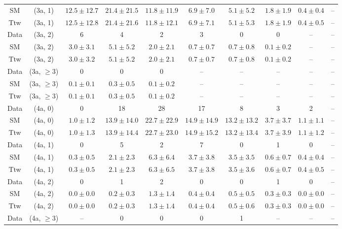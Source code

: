 \begin{table}[h!]
{\begin{tabular}{cccccccccc}
	SM & (3a, 1) & $12.5\pm 12.7$ & $21.4\pm 21.5$ & $11.8\pm 11.9$ & $6.9\pm 7.0$ & $5.1\pm 5.2$ & $1.8\pm 1.9$ & $0.4\pm 0.4$ & -- \\[0.5ex] 
	Ttw & (3a, 1) & $12.5\pm 12.8$ & $21.4\pm 21.6$ & $11.8\pm 12.1$ & $6.9\pm 7.1$ & $5.1\pm 5.3$ & $1.8\pm 1.9$ & $0.4\pm 0.5$ & -- \\[0.5ex] 
	Data & (3a, 2) & 6 & 4 & 2 & 3 & 0 & 0 & -- & -- \\[0.5ex] 
	SM & (3a, 2) & $3.0\pm 3.1$ & $5.1\pm 5.2$ & $2.0\pm 2.1$ & $0.7\pm 0.7$ & $0.7\pm 0.8$ & $0.1\pm 0.2$ & -- & -- \\[0.5ex] 
	Ttw & (3a, 2) & $3.0\pm 3.2$ & $5.1\pm 5.2$ & $2.0\pm 2.1$ & $0.7\pm 0.7$ & $0.7\pm 0.8$ & $0.1\pm 0.2$ & -- & -- \\[0.5ex] 
	Data & (3a, $\ge3$) & 0 & 0 & 0 & -- & -- & -- & -- & -- \\[0.5ex] 
	SM & (3a, $\ge3$) & $0.1\pm 0.1$ & $0.3\pm 0.5$ & $0.1\pm 0.2$ & -- & -- & -- & -- & -- \\[0.5ex] 
	Ttw & (3a, $\ge3$) & $0.1\pm 0.1$ & $0.3\pm 0.5$ & $0.1\pm 0.2$ & -- & -- & -- & -- & -- \\[0.5ex] 
	Data & (4a, 0) & 0 & 18 & 28 & 17 & 8 & 3 & 2 & -- \\[0.5ex] 
	SM & (4a, 0) & $1.0\pm 1.2$ & $13.9\pm 14.0$ & $22.7\pm 22.9$ & $14.9\pm 14.9$ & $13.2\pm 13.2$ & $3.7\pm 3.7$ & $1.1\pm 1.1$ & -- \\[0.5ex] 
	Ttw & (4a, 0) & $1.0\pm 1.3$ & $13.9\pm 14.4$ & $22.7\pm 23.0$ & $14.9\pm 15.2$ & $13.2\pm 13.4$ & $3.7\pm 3.9$ & $1.1\pm 1.2$ & -- \\[0.5ex] 
	Data & (4a, 1) & 0 & 5 & 2 & 7 & 0 & 1 & 0 & -- \\[0.5ex] 
	SM & (4a, 1) & $0.3\pm 0.5$ & $2.1\pm 2.3$ & $6.3\pm 6.4$ & $3.7\pm 3.8$ & $3.5\pm 3.5$ & $0.6\pm 0.7$ & $0.4\pm 0.4$ & -- \\[0.5ex] 
	Ttw & (4a, 1) & $0.3\pm 0.5$ & $2.1\pm 2.3$ & $6.3\pm 6.5$ & $3.7\pm 3.8$ & $3.5\pm 3.6$ & $0.6\pm 0.7$ & $0.4\pm 0.5$ & -- \\[0.5ex] 
	Data & (4a, 2) & 0 & 1 & 2 & 0 & 0 & 1 & 0 & -- \\[0.5ex] 
	SM & (4a, 2) & $0.0\pm 0.0$ & $0.2\pm 0.3$ & $1.3\pm 1.4$ & $0.4\pm 0.4$ & $0.5\pm 0.5$ & $0.3\pm 0.3$ & $0.0\pm 0.0$ & -- \\[0.5ex] 
	Ttw & (4a, 2) & $0.0\pm 0.0$ & $0.2\pm 0.3$ & $1.3\pm 1.4$ & $0.4\pm 0.4$ & $0.5\pm 0.6$ & $0.3\pm 0.3$ & $0.0\pm 0.0$ & -- \\[0.5ex] 
	Data & (4a, $\ge3$) & -- & 0 & 0 & 0 & 1 & -- & -- & -- \\[0.5ex] 

\end{tabular}}
\end{table}
